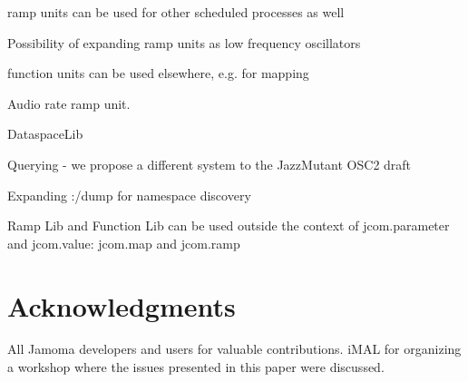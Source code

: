 \documentclass{NIME-alternate}
\begin{document}
ramp units can be used for other scheduled processes as well

Possibility of expanding ramp units as low frequency oscillators

function units can be used elsewhere, e.g. for mapping

Audio rate ramp unit.

DataspaceLib

Querying - we propose a different system to the JazzMutant OSC2 draft

Expanding :/dump for namespace discovery

Ramp Lib and Function Lib can be used outside the context of jcom.parameter and jcom.value: jcom.map and jcom.ramp











\section{Acknowledgments} %
\label{sec:acknowledgments}

All Jamoma developers and users for valuable contributions. 
iMAL for organizing a workshop where the issues presented in this paper were discussed.





%
\begin{small}

\end{small}
%


\balancecolumns %
\end{document}
